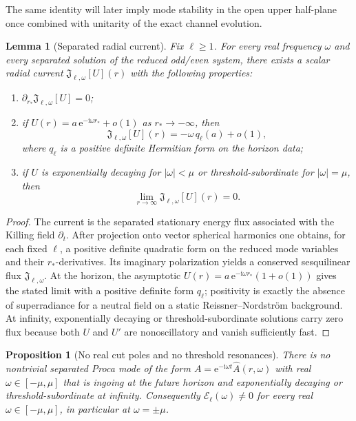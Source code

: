 \documentclass[12pt]{article}
\numberwithin{equation}{section}
\theoremstyle{plain}
\newtheorem{proposition}[theorem]{Proposition}
\newtheorem{lemma}[theorem]{Lemma}
\theoremstyle{definition}
\theoremstyle{remark}
\newcommand{\ii}{\mathrm i}
\newcommand{\ee}{\mathrm e}
\newcommand{\cE}{\mathcal E}
\newcommand{\om}{\omega}
\newcommand{\abs}[1]{\left|#1\right|}
\begin{document}
The same identity will later imply mode stability in the open upper half-plane once combined with unitarity of the exact channel evolution.


\begin{lemma}[Separated radial current]\label{lem:radial_current}
Fix $\ell\ge1$.  For every real frequency $\om$ and every separated solution of the reduced odd/even system, there exists a scalar radial current $\mathfrak J_{\ell,\om}[U](r)$ with the following properties:
\begin{enumerate}[label=\textnormal{(\alph*)}]
   \item $\partial_{r_*}\mathfrak J_{\ell,\om}[U]=0$;
   \item if $U(r)=a\,\ee^{-\ii\om r_*}+o(1)$ as $r_*\to-\infty$, then
   \[
      \mathfrak J_{\ell,\om}[U](r)
      =
      -\om\,q_\ell(a)+o(1),
   \]
   where $q_\ell$ is a positive definite Hermitian form on the horizon data;
   \item if $U$ is exponentially decaying for $\abs{\om}<\mu$ or threshold-subordinate for $\abs{\om}=\mu$, then
   \[
      \lim_{r\to\infty}\mathfrak J_{\ell,\om}[U](r)=0.
   \]
\end{enumerate}
\end{lemma}

\begin{proof}
The current is the separated stationary energy flux associated with the Killing field $\partial_t$.  After projection onto vector spherical harmonics one obtains, for each fixed $\ell$, a positive definite quadratic form on the reduced mode variables and their $r_*$-derivatives.  Its imaginary polarization yields a conserved sesquilinear flux $\mathfrak J_{\ell,\om}$.  At the horizon, the asymptotic $U(r)=a\,\ee^{-\ii\om r_*}(1+o(1))$ gives the stated limit with a positive definite form $q_\ell$; positivity is exactly the absence of superradiance for a neutral field on a static Reissner--Nordstr\"om background.  At infinity, exponentially decaying or threshold-subordinate solutions carry zero flux because both $U$ and $U'$ are nonoscillatory and vanish sufficiently fast.
\end{proof}

\begin{proposition}[No real cut poles and no threshold resonances]\label{prop:no_real_poles}
There is no nontrivial separated Proca mode of the form $A=\ee^{-\ii\om t}\widehat A(r,\omega)$ with real $\om\in[-\mu,\mu]$ that is ingoing at the future horizon and exponentially decaying or threshold-subordinate at infinity.  Consequently $\cE_\ell(\om)\neq0$ for every real $\om\in[-\mu,\mu]$, in particular at $\om=\pm\mu$.
\end{proposition}
\end{document}
